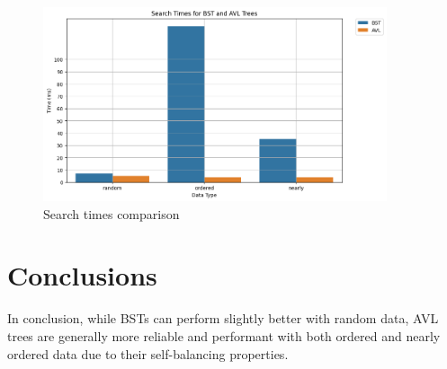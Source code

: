 \documentclass{article}
\begin{document}
\begin{figure}[h]
\centering
\includegraphics[width=0.9\textwidth]{../data/graphs/search_times.png}
\caption{Search times comparison}
\end{figure}
\newpage


\maketitle
\section{Conclusions}

In conclusion, while BSTs can perform slightly better with random data, AVL trees are generally more reliable and performant with both ordered and nearly ordered data due to their self-balancing properties.
\end{document}
